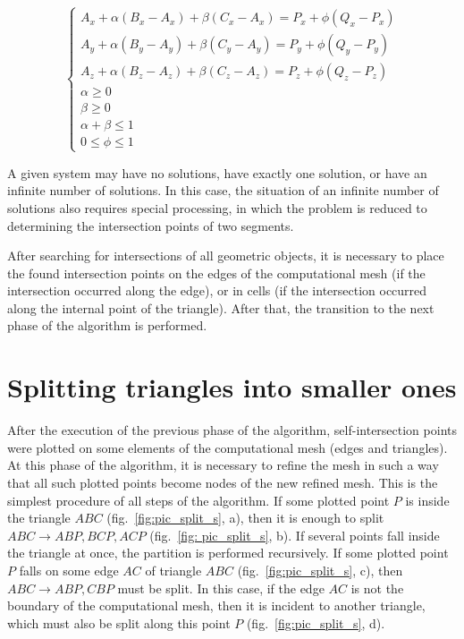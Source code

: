 \documentclass[
11pt,%
tightenlines,%
twoside,%
onecolumn,%
nofloats,%
nobibnotes,%
nofootinbib,%
superscriptaddress,%
noshowpacs,%
centertags]%
{revtex4}
\begin{document}
\begin{equation}
\begin{cases}
A_x + \alpha(B_x - A_x) + \beta(C_x - A_x) = P_x + \phi(Q_x - P_x) \\
A_y + \alpha(B_y - A_y) + \beta(C_y - A_y) = P_y + \phi(Q_y - P_y) \\
A_z + \alpha(B_z - A_z) + \beta(C_z - A_z) = P_z + \phi(Q_z - P_z) \\
\alpha \ge 0 \\
\beta \ge 0 \\
\alpha + \beta \le 1 \\
0 \le \phi \le 1
\end{cases}
\end{equation}

A given system may have no solutions, have exactly one solution, or have an infinite number of solutions.
In this case, the situation of an infinite number of solutions also requires special processing, in which the problem is reduced to determining the intersection points of two segments.

After searching for intersections of all geometric objects, it is necessary to place the found intersection points on the edges of the computational mesh (if the intersection occurred along the edge), or in cells (if the intersection occurred along the internal point of the triangle).
After that, the transition to the next phase of the algorithm is performed.

\section{Splitting triangles into smaller ones}

After the execution of the previous phase of the algorithm, self-intersection points were plotted on some elements of the computational mesh (edges and triangles).
At this phase of the algorithm, it is necessary to refine the mesh in such a way that all such plotted points become nodes of the new refined mesh.
This is the simplest procedure of all steps of the algorithm.
If some plotted point $P$ is inside the triangle $ABC$ (fig.~\ref{fig:pic_split_s}, a), then it is enough to split $ABC \rightarrow ABP, BCP, ACP$ (fig.~\ref{fig: pic_split_s}, b).
If several points fall inside the triangle at once, the partition is performed recursively.
If some plotted point $P$ falls on some edge $AC$ of triangle $ABC$ (fig.~\ref{fig:pic_split_s}, c), then $ABC \rightarrow ABP, CBP$ must be split.
In this case, if the edge $AC$ is not the boundary of the computational mesh, then it is incident to another triangle, which must also be split along this point $P$ (fig.~\ref{fig:pic_split_s}, d).
\end{document}

